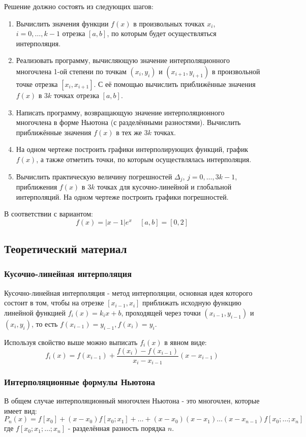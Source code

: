 \documentclass[12pt]{article}%
\begin{document}
Решение должно состоять из следующих шагов:
\begin{enumerate}
    \item Вычислить значения функции $f(x)$ в произвольных точках $x_i$, $i=0, \dots, k-1$ отрезка $[a, b]$, по которым будет осуществляться интерполяция.
    \item Реализовать программу, вычисляющую значение интерполяционного многочлена 1-ой степени по точкам $(x_i, y_i)$ и $(x_{i+1}, y_{i+1})$ в произвольной точке отрезка $[x_i, x_{i+1}]$. С её помощью вычислить приближённые значения $f(x)$ в $3k$ точках отрезка $[a, b]$.
    \item Написать программу, возвращающую значение интерполяционного многочлена в форме Ньютона (с разделёнными разностями). Вычислить приближённые значения $f(x)$ в тех же $3k$ точках.
    \item На одном чертеже построить графики интерполирующих функций, график $f(x)$, а также отметить точки, по которым осуществлялась интерполяция.
    \item Вычислить практическую величину погрешностей $\Delta_j$, $j = 0, \dots, 3k - 1$, приближения $f(x)$ в $3k$ точках для кусочно-линейной и глобальной интерполяций. На одном чертеже построить графики погрешностей.
\end{enumerate}

В соответствии с вариантом:
\[
f(x)=|x-1|e^x\ \ \ \ \ [a, b] = [0, 2]
\]


\subsection{Теоретический материал}
\subsubsection{Кусочно-линейная интерполяция}
Кусочно-линейная интерполяция - метод интерполяции, основная идея которого состоит в том, чтобы на отрезке $[x_{i-1}, x_i]$ приближать исходную функцию линейной функцией $f_i(x) = k_i x + b$, проходящей через точки $(x_{i-1}, y_{i-1})$ и $(x_i, y_i)$, то есть $f(x_{i-1}) = y_{i-1}, f(x_i) = y_i$.

Используя свойство выше можно выписать $f_i(x)$ в явном виде:
\[
f_i(x) = f(x_{i-1}) + \frac{f(x_i) - f(x_{i-1})}{x_i - x_{i-1}}
\left( x - x_{i-1} \right)
\]

\subsubsection{Интерполяционные формулы Ньютона}
В общем случае интерполяционный многочлен Ньютона - это многочлен, которые имеет вид:
\[
P_n(x) = f[x_0] + (x - x_0)f[x_0; x_1] + 
\dots + (x - x_0)(x - x_1)\dots(x - x_{n-1})f[x_0;\dots;x_n] 
\]
где $f[x_0;x_1;\dots;x_n]$ - разделённая разность порядка $n$.
\end{document}
